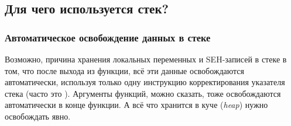 \subsection{Для чего используется стек?}








\subsubsection{Автоматическое освобождение данных в стеке}

Возможно, причина хранения локальных переменных и SEH-записей в стеке в том, что после выхода из функции, всё эти данные освобождаются автоматически,
используя только одну инструкцию корректирования указателя стека (часто это \ADD).
Аргументы функций, можно сказать, тоже освобождаются автоматически в конце функции.
А всё что хранится в куче (\emph{heap}) нужно освобождать явно.





